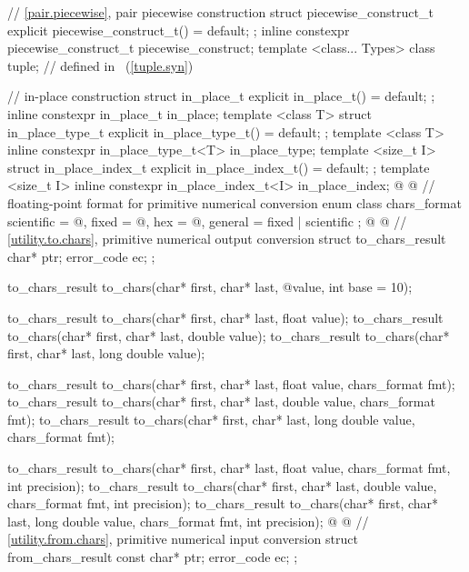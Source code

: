 \begin{codeblock}
{  // \ref{pair.piecewise}, pair piecewise construction
  struct piecewise_construct_t {
    explicit piecewise_construct_t() = default;
  };
  inline constexpr piecewise_construct_t piecewise_construct{};
  template <class... Types> class tuple;        // defined in ~(\ref{tuple.syn})

  // in-place construction
  struct in_place_t {
    explicit in_place_t() = default;
  };
  inline constexpr in_place_t in_place{};
  template <class T>
    struct in_place_type_t {
      explicit in_place_type_t() = default;
    };
  template <class T> inline constexpr in_place_type_t<T> in_place_type{};
  template <size_t I>
    struct in_place_index_t {
      explicit in_place_index_t() = default;
    };
  template <size_t I> inline constexpr in_place_index_t<I> in_place_index{};
@
%
%
%
%
%
@
  // floating-point format for primitive numerical conversion
  enum class chars_format {
    scientific = @\unspec@,
    fixed = @\unspec@,
    hex = @\unspec@,
    general = fixed | scientific
  };
@
%
%
@
  // \ref{utility.to.chars}, primitive numerical output conversion
  struct to_chars_result {
    char* ptr;
    error_code ec;
  };

  to_chars_result to_chars(char* first, char* last, @\seebelow@ value, int base = 10);

  to_chars_result to_chars(char* first, char* last, float value);
  to_chars_result to_chars(char* first, char* last, double value);
  to_chars_result to_chars(char* first, char* last, long double value);

  to_chars_result to_chars(char* first, char* last, float value,
                           chars_format fmt);
  to_chars_result to_chars(char* first, char* last, double value,
                           chars_format fmt);
  to_chars_result to_chars(char* first, char* last, long double value,
                           chars_format fmt);

  to_chars_result to_chars(char* first, char* last, float value,
                           chars_format fmt, int precision);
  to_chars_result to_chars(char* first, char* last, double value,
                           chars_format fmt, int precision);
  to_chars_result to_chars(char* first, char* last, long double value,
                           chars_format fmt, int precision);
@
%
%
@
  // \ref{utility.from.chars}, primitive numerical input conversion
  struct from_chars_result {
    const char* ptr;
    error_code ec;
  };

}
\end{codeblock}
